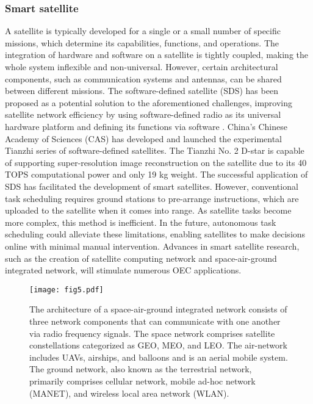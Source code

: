 \documentclass[lettersize,journal]{IEEEtran}
\begin{document}
\subsubsection*{Smart satellite}
A satellite is typically developed for a single or a small number of specific missions, which determine its capabilities, functions, and operations. The integration of hardware and software on a satellite is tightly coupled, making the whole system inflexible and non-universal. However, certain architectural components, such as communication systems and antennas, can be shared between different missions. The software-defined satellite (SDS) has been proposed as a potential solution to the aforementioned challenges, improving satellite network efficiency by using software-defined radio as its universal hardware platform and defining its functions via software \cite{RN199}. China's Chinese Academy of Sciences (CAS) has developed and launched the experimental Tianzhi series of software-defined satellites. The Tianzhi No. 2 D-star is capable of supporting super-resolution image reconstruction on the satellite due to its 40 TOPS computational power and only 19 kg weight. The successful application of SDS has facilitated the development of smart satellites. However, conventional task scheduling requires ground stations to pre-arrange instructions, which are uploaded to the satellite when it comes into range. As satellite tasks become more complex, this method is inefficient. In the future, autonomous task scheduling could alleviate these limitations, enabling satellites to make decisions online with minimal manual intervention. Advances in smart satellite research, such as the creation of satellite computing network \cite{RN206} and space-air-ground integrated network, will stimulate numerous OEC applications.

\begin{figure}
  \centering
  \texttt{[image: fig5.pdf]}
  \caption{The architecture of a space-air-ground integrated network consists of three network components that can communicate with one another via radio frequency signals. The space network comprises satellite constellations categorized as GEO, MEO, and LEO. The air-network includes UAVs, airships, and balloons and is an aerial mobile system. The ground network, also known as the terrestrial network, primarily comprises cellular network, mobile ad-hoc network (MANET), and wireless local area network (WLAN).}
  \label{Fig5}
\end{figure}
\end{document}
